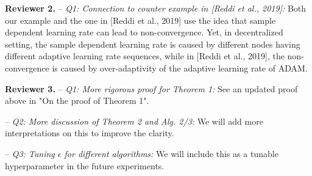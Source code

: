 \documentclass{article}
\begin{document}
\vspace{-2pt}

\textbf{Reviewer 2.}
-- \textit{Q1: Connection to counter example in [Reddi et al., 2019]:}
Both our example and the one in [Reddi et al., 2019] use the idea that sample dependent learning rate can lead to non-convergence. 
Yet, in decentralized setting, the sample dependent learning rate is caused by different nodes having different adaptive learning rate sequences, while in [Reddi et al., 2019], the non-convergence is caused by over-adaptivity of the adaptive learning rate of ADAM. 


\vspace{-2pt}

\textbf{Reviewer 3.} 
-- \textit{Q1: More rigorous proof for Theorem 1:}
 See an updated proof above in "On the proof of Theorem 1".\vspace{-5pt}

-- \textit{Q2: More discussion of Theorem 2 and Alg. 2/3:}
We will add more interpretations on this to improve the clarity.\vspace{-5pt}

-- \textit{Q3: Tuning $\epsilon$ for different algorithms:}
We will include this as a tunable hyperparameter in the future experiments. 

\vspace{-2pt}
\end{document}
